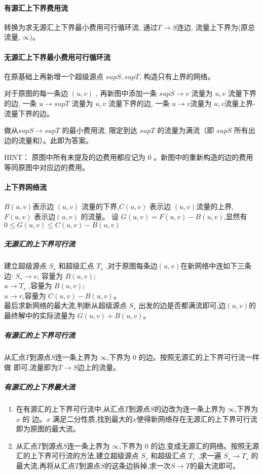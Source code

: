 \paragraph{有源汇上下界费用流}
转换为求无源汇上下界最小费用可行循环流, 通过$T \rightarrow S$连边, 流量上下界为(原总流量, $\infty$)。

\paragraph{无源汇上下界最小费用可行循环流}
    在原基础上再新增一个超级源点 $supS, supT$, 构造只有上界的网络。

    对于原图的每一条边 $(u, v)$ , 再新图中添加一条 $supS\rightarrow v$ 流量为 $u, v$ 流量下界的边, 一条 $u\rightarrow supT$ 流量为 $u, v$ 流量下界的边, 一条 $u\rightarrow v$流量为 $u, v $流量上界-流量下界的边。

    做从$ supS\rightarrow supT$ 的最小费用流, 限定到达 $supT$ 的流量为满流（即 $supS$ 所有出边的流量和）。此即为答案。
    
    HINT： 原图中所有未提及的边费用都应记为 0 。新图中的重新构造的边的费用等同原图中对应边的费用。

\paragraph{上下界网络流}
$B(u, v) $表示边 $(u, v)$ 流量的下界,$C(u, v)$ 表示边 $(u, v) $流量的上界,$F (u, v)$ 表示边$ (u, v)$
的流量。
设 $G(u, v) = F (u, v) − B(u, v)$,显然有$0 \leq G(u, v) \leq C(u, v) − B(u, v)$

\subparagraph{无源汇的上下界可行流}
建立超级源点 $S_∗$ 和超级汇点 $T_∗$ ,对于原图每条边$ (u, v) $在新网络中连如下三条边: 
$S_∗ \rightarrow  v$, 容量为 $B(u, v)$;\\
 $u \rightarrow  T_∗$ ,容量为 $B(u, v)$;\\
 $u \rightarrow  v$,容量为 $C(u, v) − B(u, v)$。\\
最后求新网络的最大流,判断从超级源点 $S_∗$ 出发的边是否都满流即可,边$ (u, v) $的最终解中的实际流量为
$G(u, v) + B(u, v)$。

\subparagraph{有源汇的上下界可行流}
从汇点$ T $到源点$ S $连一条上界为 $\infty$,下界为 0 的边。按照无源汇的上下界可行流一样做
即可,流量即为$T \rightarrow S $边上的流量。

\subparagraph{有源汇的上下界最大流}
\begin{enumerate}
\item 在有源汇的上下界可行流中,从汇点$ T $到源点$ S $的边改为连一条上界为 $\infty$,下界为 $x$ 的
边。$x$ 满足二分性质,找到最大的$ x $使得新网络存在无源汇的上下界可行流即为原图的最大流。
\item 从汇点$ T $到源点$ S $连一条上界为 $\infty$,下界为 0 的边,变成无源汇的网络。按照无源汇的上下界可行流的方法,建立超级源点 $S_∗$ 和超级汇点 $T_∗$ ,求一遍 $S_∗ \rightarrow  T_∗$ 的最大流,再将从汇点$ T $到源点$ S $的这条边拆掉,求一次$S \rightarrow  T$的最大流即可。
\end{enumerate}

